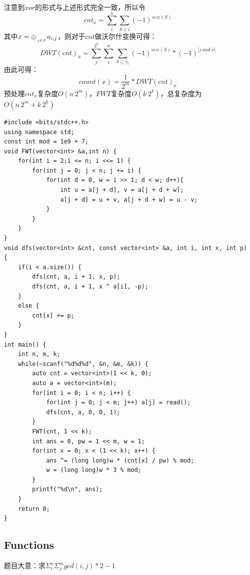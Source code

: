 \documentclass[10pt]{ctexart}
\begin{document}
{注意到$xor$的形式与上述形式完全一致，所以令
$$cnt_x = \sum_i^n \sum_{S \in i} (-1)^{size(S)}$$
其中$x=\oplus_{\atop j \in S} a_{i,j}$，则对于$cnt$做沃尔什变换可得：
$$
DWT(cnt)_x=\sum_j^{2^k}\sum_i^n\sum_{S \subseteq v_i} (-1)^{size(S)}*(-1)^{|j \ and \ x|}
$$
由此可得：
$$count(x)=\frac{1}{2^m} *DWT(cnt)_x$$
预处理$cnt_x$复杂度$O(n\  2^m)$，$FWT$复杂度$O(k\ 2^k)$，总复杂度为$O(n \ 2^m + k \ 2^k)$

\begin{lstlisting}
#include <bits/stdc++.h>
using namespace std;
const int mod = 1e9 + 7;
void FWT(vector<int> &a,int n) {
    for(int i = 2;i <= n; i <<= 1) {
        for(int j = 0; j < n; j += i) {
            for(int d = 0, w = i >> 1; d < w; d++){
                int u = a[j + d], v = a[j + d + w];
                a[j + d] = u + v, a[j + d + w] = u - v;
            }
        }
    }
}
void dfs(vector<int> &cnt, const vector<int> &a, int i, int x, int p) {
    if(i < a.size()) {
        dfs(cnt, a, i + 1, x, p);
        dfs(cnt, a, i + 1, x ^ a[i], -p);
    }
    else {
        cnt[x] += p;
    }
}
int main() {
    int n, m, k;
    while(~scanf("%d%d%d", &n, &m, &k)) {
        auto cnt = vector<int>(1 << k, 0);
        auto a = vector<int>(m);
        for(int i = 0; i < n; i++) {
            for(int j = 0; j < m; j++) a[j] = read();
            dfs(cnt, a, 0, 0, 1);
        }
        FWT(cnt, 1 << k);
        int ans = 0, pw = 1 << m, w = 1;
        for(int x = 0; x < (1 << k); x++) {
            ans ^= (long long)w * (cnt[x] / pw) % mod;
            w = (long long)w * 3 % mod;
        }
        printf("%d\n", ans);
    }
    return 0;
} 
\end{lstlisting}
\subsection{Functions}
题目大意：求$\Sigma_i^n\Sigma_j^mgcd(i, j) * 2 - 1$\\

}
\end{document}
